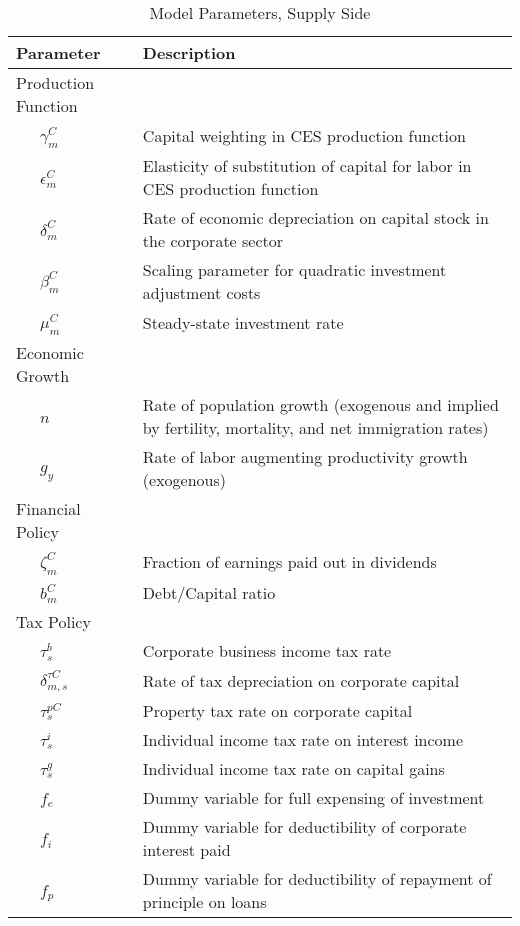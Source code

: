 \documentclass[article,11pt,letterpaper,fleqn]{article}
\theoremstyle{definition}
\numberwithin{equation}{section}
\begin{document}
\begin{table}[htbp]
  \centering
  \caption{Model Parameters, Supply Side}
    \begin{tabular}{ll}
    \hline
    \hline
    Parameter & Description \\
    \hline
    Production Function &  \\
    \ \ \ $\gamma^{C}_{m}$ & Capital weighting in CES production function \\
    \ \ \ $\epsilon^{C}_{m}$ & Elasticity of substitution of capital for labor in CES production function \\
    \ \ \ $\delta^{C}_{m}$ & Rate of economic depreciation on capital stock in the corporate sector \\
    \ \ \ $\beta^{C}_{m}$ & Scaling parameter for quadratic investment adjustment costs \\
    \ \ \ $\mu^{C}_{m}$ & Steady-state investment rate \\
    Economic Growth &  \\
    \ \ \ $n$ & Rate of population growth (exogenous and implied by fertility, mortality, and net immigration rates) \\
    \ \ \ $g_{y}$ & Rate of labor augmenting productivity growth (exogenous) \\
    Financial Policy &  \\
    \ \ \ $\zeta^{C}_{m}$ & Fraction of earnings paid out in dividends \\
    \ \ \ $b^{C}_{m}$ & Debt/Capital ratio \\
    Tax Policy &  \\
    \ \ \ $\tau^{b}_{s}$ & Corporate business income tax rate \\
    \ \ \ $\delta^{\tau C}_{m,s}$ & Rate of tax depreciation on corporate capital \\
    \ \ \ $\tau^{pC}_{s}$ & Property tax rate on corporate capital \\
    \ \ \ $\tau^{i}_{s}$ & Individual income tax rate on interest income \\
    \ \ \ $\tau^{g}_{s}$ & Individual income tax rate on capital gains \\
    \ \ \ $f_{e}$ & Dummy variable for full expensing of investment  \\
    \ \ \ $f_{i}$ & Dummy variable for deductibility of corporate interest paid \\
    \ \ \ $f_{p}$ & Dummy variable for deductibility of repayment of principle on loans \\

\end{tabular}
\end{table}
\end{document}
